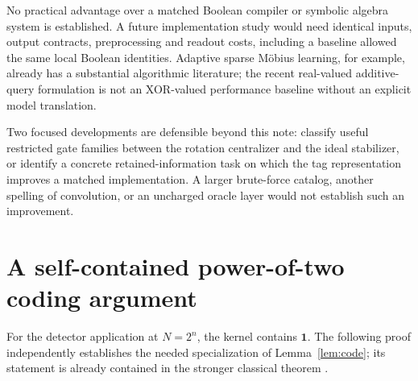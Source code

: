 \documentclass[11pt,a4paper]{article}
\theoremstyle{definition}\newtheorem{definition}[theorem]{Definition}
\theoremstyle{remark}\newtheorem{remark}[theorem]{Remark}
\numberwithin{equation}{section}
\begin{document}
No practical advantage over a matched Boolean compiler or symbolic algebra system is established. A future implementation study would need identical inputs, output contracts, preprocessing and readout costs, including a baseline allowed the same local Boolean identities. Adaptive sparse M\"obius learning, for example, already has a substantial algorithmic literature; the recent real-valued additive-query formulation \cite{Sparse2026} is not an XOR-valued performance baseline without an explicit model translation.

Two focused developments are defensible beyond this note: classify useful restricted gate families between the rotation centralizer and the ideal stabilizer, or identify a concrete retained-information task on which the tag representation improves a matched implementation. A larger brute-force catalog, another spelling of convolution, or an uncharged oracle layer would not establish such an improvement.

\appendix
\section{A self-contained power-of-two coding argument}\label{app:polynomial}
For the detector application at $N=2^n$, the kernel contains $\mathbf1$. The following proof independently establishes the needed specialization of Lemma~\ref{lem:code}; its statement is already contained in the stronger classical theorem \cite{EFIN}.
\end{document}
